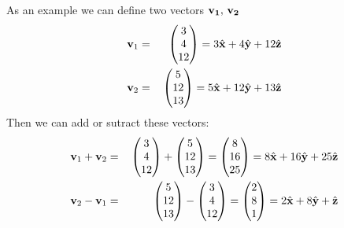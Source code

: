\documentclass[letterpaper,10pt,english]{jupyterBook}
\begin{document}
\sphinxAtStartPar
As an example we can define two vectors \(\bf v_1,\, v_2\)
\begin{equation*}
\begin{split}{\bf v}_1 &=&\, \begin{pmatrix}
 3 \\
 4 \\
 12 
\end{pmatrix} = 3\hat{\bf x} + 4\hat{\bf y} + 12\hat{\bf z}\\
{\bf v}_2 &=&\, \begin{pmatrix}
 5 \\
 12 \\
 13 
\end{pmatrix} = 5\hat{\bf x} + 12\hat{\bf y} + 13\hat{\bf z}\end{split}
\end{equation*}
\sphinxAtStartPar
Then we can add or sutract these vectors:
\begin{equation*}
\begin{split}{\bf v}_1 + {\bf v}_2  &=&\, \begin{pmatrix}
 3 \\
 4 \\
 12 
\end{pmatrix} + \begin{pmatrix}
 5 \\
 12 \\
 13 
\end{pmatrix} = \begin{pmatrix}
 8 \\
 16 \\
 25 
\end{pmatrix} = 8\hat{\bf x} + 16\hat{\bf y} + 25\hat{\bf z}\\
{\bf v}_2 - {\bf v}_1  &=&\, \begin{pmatrix}
 5 \\
 12 \\
 13 
\end{pmatrix} - 
\begin{pmatrix}
 3 \\
 4 \\
 12 
\end{pmatrix} = \begin{pmatrix}
 2 \\
 8 \\
 1 
\end{pmatrix} = 2\hat{\bf x} + 8\hat{\bf y} + \hat{\bf z}
\end{split}
\end{equation*}
\end{document}
